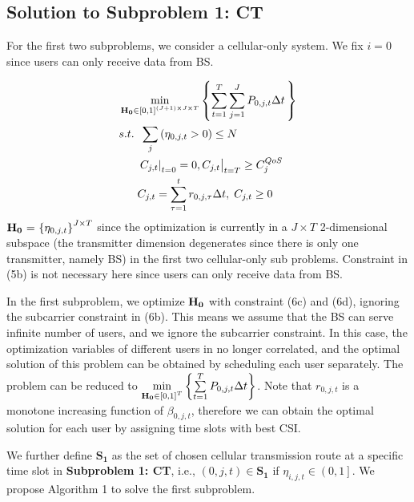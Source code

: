 \documentclass{ieeeaccess}
\begin{document}
\subsection{Solution to \textbf{Subproblem 1: CT}}

For the first two subproblems, we consider a cellular-only system. We fix $i = 0$ since users can only receive data from BS.

\begin{subequations}
\begin{align}
& \mathop {\min }\limits_{{\mathbf{{\rm H}}}_{\mathbf{0}} \in {{\left[ {0,1} \right]}^{\left( {J + 1} \right) \times J \times T}}} \left\{ {\sum\limits_{t = 1}^T {\sum\limits_{j = 1}^J {{P_{0,j,t}}\Delta t} \,} } \right\} \\
& {s.t.} \;\; \sum\limits_j  {\left( {{\eta _{0,j,t}} > 0} \right)}   \le N \\
& \;\;\;\;\;\; {\left. {{{\left. {{C_{j,t}}} \right|}_{t = 0}} = 0, {C_{j,t}}} \right|_{t = T}} \ge C_j^{QoS} \\
& \;\;\;\;\;\; {C_{j,t}} = \sum\limits_{\tau  = 1}^t {{r_{0,j,\tau }}\Delta t} ,\; {C_{j,t}} \ge 0
\end{align}
\end{subequations}
${{\mathbf{{\rm H}}}_{\mathbf{0}}}{\text{ = }}{\left\{ {{\eta _{0,j,t}}} \right\}^{J \times T}}$ since the optimization is currently in a $J \times T$ 2-dimensional subspace (the transmitter dimension degenerates since there is only one transmitter, namely BS) in the first two cellular-only sub problems. Constraint in (5b) is not necessary here since users can only receive data from BS.

In the first subproblem, we optimize ${{\mathbf{{\rm H}}}_{\mathbf{0}}}$ with constraint (6c) and (6d), ignoring the subcarrier constraint in (6b). This means we assume that the BS can serve infinite number of users, and we ignore the subcarrier constraint. In this case, the optimization variables of different users in no longer correlated, and the optimal solution of this problem can be obtained by scheduling each user separately. The problem can be reduced to $\mathop {\min }\limits_{{{\mathbf{{\rm H}}}_{\mathbf{0}}} \in {{\left[ {0,1} \right]}^T}} \left\{ {\sum\limits_{t = 1}^T {{P_{0,j,t}}\Delta t} } \right\}$. Note that ${r_{0,j,t}}$ is a monotone increasing function of ${\beta _{0,j,t}}$, therefore we can obtain the optimal solution for each user by assigning time slots with best CSI. 

We further define ${{\mathbf{S}}_{\mathbf{1}}}$ as the set of chosen cellular transmission route at a specific time slot in \textbf{Subproblem 1: CT}, i.e., $\left( {0,j,t} \right) \in {\mathbf{S}}_{\mathbf{1}}$ if ${\eta _{i,j,t}} \in \left( {0,1} \right]$. We propose Algorithm 1 to solve the first subproblem.
\end{document}
